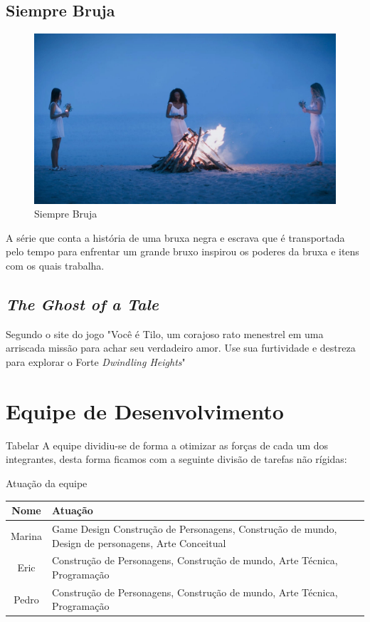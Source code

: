 \vfill
\pagebreak

\subsection{Siempre Bruja}

\begin{figure}[htb]
	\caption{\label{siempre}Siempre Bruja}
	\begin{center}
	    \includegraphics[width=\textwidth]{imagens/SiempreBruja.jpg}
	\end{center}
\end{figure}

A série que conta a história de uma bruxa negra e escrava que é transportada  pelo tempo para enfrentar um grande bruxo inspirou os poderes da bruxa e itens com os quais trabalha. 

\vfill
\pagebreak

\subsection{\textit{The Ghost of a Tale}}
Segundo o site do jogo  "Você é Tilo, um corajoso rato menestrel em uma arriscada missão para achar seu verdadeiro amor. Use sua furtividade e destreza para explorar o Forte \textit{Dwindling Heights}"


\section{Equipe de Desenvolvimento}
Tabelar
A equipe dividiu-se de forma a otimizar as forças de cada um dos integrantes, desta forma ficamos com a seguinte divisão de tarefas não rígidas:

\begin{quadro}[htb]
\caption{\label{quadro_atuacao}Atuação da equipe}
\begin{tabularx}{\textwidth}{|c|X|}
	\hline
	\textbf{Nome} & \textbf{Atuação}\\ \hline
    Marina & Game Design Construção de Personagens, Construção de mundo, Design de personagens, Arte Conceitual \\ \hline
    Eric   & Construção de Personagens, Construção de mundo, Arte Técnica, Programação                                        \\ \hline
    Pedro  & Construção de Personagens, Construção de mundo, Arte Técnica, Programação \\ \hline
\end{tabularx}
\end{quadro}